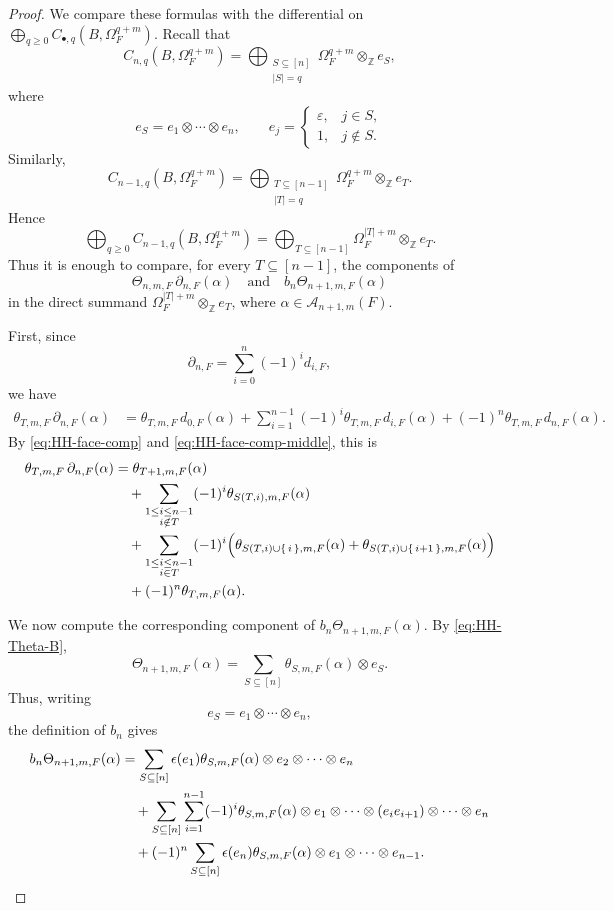 \documentclass[a4paper,12pt,reqno]{amsart}
\numberwithin{equation}{section}
\theoremstyle{definition}
\newcommand{\Z}{\mathbb{Z}}
\newcommand{\Acal}{\mathcal{A}}
\begin{document}
\begin{proof}
We compare these formulas with the differential on
$ \bigoplus_{q\geq0} C_{\bullet,q}(B,\Omega_F^{q+m})$. 
Recall that
\[
 C_{n,q}(B,\Omega_F^{q+m})
 =
 \bigoplus_{\substack{S\subseteq[n]\\|S|=q}}
 \Omega_F^{q+m}\otimes_{\Z}e_S,
\]
where 
\[
 e_S=e_1\otimes\cdots\otimes e_n,
 \qquad
 e_j=
 \begin{cases}
 \varepsilon,&j\in S,\\
 1,&j\notin S.
 \end{cases}
\]
Similarly,
\[
 C_{n-1,q}(B,\Omega_F^{q+m})
 =
 \bigoplus_{\substack{T\subseteq[n-1]\\|T|=q}}
 \Omega_F^{q+m}\otimes_{\Z}e_T.
\]
Hence
\[
 \bigoplus_{q\geq0}
 C_{n-1,q}(B,\Omega_F^{q+m})
 =
 \bigoplus_{T\subseteq[n-1]}
 \Omega_F^{|T|+m}\otimes_{\Z}e_T.
\]
Thus it is enough to compare, for every $T\subseteq[n-1]$, the
components of
\[
 \Theta_{n,m,F}\,\partial_{n,F}(\alpha)
 \quad\mbox{and}\quad
 b_n\Theta_{n+1,m,F}(\alpha)
\]
in the direct summand
$\Omega_F^{|T|+m}\otimes_{\Z}e_T$,
where $\alpha\in\Acal_{n+1,m}(F)$.

First, since
\[
 \partial_{n,F}
 =
 \sum_{i=0}^{n}(-1)^i d_{i,F},
\]
we have
\begin{align*}
\theta_{T,m,F}\,\partial_{n,F}(\alpha)
&=
\theta_{T,m,F}\,d_{0,F}(\alpha)
+
\sum_{i=1}^{n-1}(-1)^i
\theta_{T,m,F}\,d_{i,F}(\alpha)%
+(-1)^n\theta_{T,m,F}\,d_{n,F}(\alpha).
\end{align*}
By \eqref{eq:HH-face-comp} and
\eqref{eq:HH-face-comp-middle}, this is
\begin{align}
\theta_{T,m,F}\,\partial_{n,F}(\alpha)
&=
\theta_{T+1,m,F}(\alpha)\notag\\
&\quad+
\sum_{\substack{1\leq i\leq n-1\\i\notin T}}
(-1)^i\theta_{S(T,i),m,F}(\alpha)\notag\\
&\quad+
\sum_{\substack{1\leq i\leq n-1\\i\in T}}
(-1)^i
\Bigl(
\theta_{S(T,i)\cup\set{i},m,F}(\alpha)
+
\theta_{S(T,i)\cup\set{i+1},m,F}(\alpha)
\Bigr)\notag\\
&\quad+
(-1)^n\theta_{T,m,F}(\alpha).
\label{eq:HH-left-T}
\end{align}

We now compute the corresponding component of
$b_n\Theta_{n+1,m,F}(\alpha)$.  By \eqref{eq:HH-Theta-B},
\[
 \Theta_{n+1,m,F}(\alpha)
 =
 \sum_{S\subseteq[n]}
 \theta_{S,m,F}(\alpha)\otimes e_S.
\]
Thus, writing
\[
 e_S=e_1\otimes\cdots\otimes e_n,
\]
the definition of $b_n$ gives
\begin{align}
b_n\Theta_{n+1,m,F}(\alpha)
&=
\sum_{S\subseteq[n]}
\epsilon(e_1)\theta_{S,m,F}(\alpha)
\otimes e_2\otimes\cdots\otimes e_n
\notag\\
&\quad+
\sum_{S\subseteq[n]}
\sum_{i=1}^{n-1}(-1)^i
\theta_{S,m,F}(\alpha)
\otimes
e_1\otimes\cdots\otimes
(e_i e_{i+1})
\otimes\cdots\otimes e_n
\notag\\
&\quad+
(-1)^n
\sum_{S\subseteq[n]}
\epsilon(e_n)\theta_{S,m,F}(\alpha)
\otimes e_1\otimes\cdots\otimes e_{n-1}.
\label{eq:HH-right-expansion}
\end{align}


\end{proof}
\end{document}

